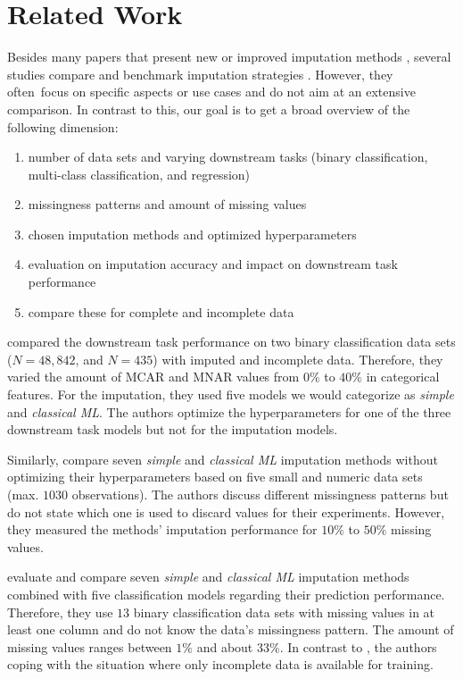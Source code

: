 \section{Related Work}

Besides many papers that present new or improved imputation methods \citep{Imputation_Benchmark_4, Imputation_Benchmark_6, GAIN, VAE_for_genomic_data, HIVAE, MisGAN, VIGAN}, several studies compare and benchmark imputation strategies \citep{Imputation_Benchmark_1, Imputation_Benchmark_2, Imputation_Benchmark_3}. However, they often focus on specific aspects or use cases and do not aim at an extensive comparison. In contrast to this, our goal is to get a broad overview of the following  dimension:
%
\begin{enumerate}
	\item number of data sets and varying downstream tasks (binary classification, multi-class classification, and regression)
	\item missingness patterns and amount of missing values
	\item chosen imputation methods and optimized hyperparameters
	\item evaluation on imputation accuracy and impact on downstream task performance
	\item compare these for complete and incomplete data
\end{enumerate}

\cite{Imputation_Benchmark_3} compared the downstream task performance on two binary classification data sets ($N = 48,842$, and $N = 435$) with imputed and incomplete data. Therefore, they varied the amount of MCAR and MNAR values from $0\%$ to $40\%$ in categorical features. For the imputation, they used five models we would categorize as \emph{simple} and \emph{classical ML}. The authors optimize the hyperparameters for one of the three downstream task models but not for the imputation models.

Similarly, \cite{Imputation_Benchmark_2} compare seven \emph{simple} and \emph{classical ML} imputation methods without optimizing their hyperparameters based on five small and numeric data sets (max. $1030$ observations). The authors discuss different missingness patterns but do not state which one is used to discard values for their experiments. However, they measured the methods' imputation performance for $10\%$ to $50\%$ missing values.

\cite{Imputation_Benchmark_1} evaluate and compare seven \emph{simple} and \emph{classical ML} imputation methods combined with five classification models regarding their prediction performance. Therefore,  they use $13$ binary classification data sets with missing values in at least one column and do not know the data's missingness pattern. The amount of missing values ranges between $1\%$ and about $33\%$. In contrast to \citep{Imputation_Benchmark_3, Imputation_Benchmark_2}, the authors coping with the situation where only incomplete data is available for training.

